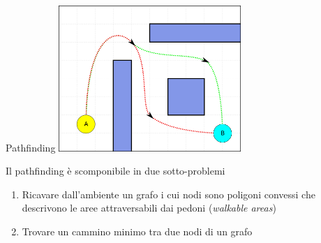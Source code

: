 \documentclass{beamer}
\begin{document}
\begin{frame}[fragile]{Pathfinding}
\hfil\hfil\includegraphics[width=6.9cm]{figures/pathfinding.png}
\begin{block}{Il pathfinding è scomponibile in due sotto-problemi}
\begin{enumerate}
    \item Ricavare dall'ambiente un grafo i cui nodi sono \textcolor{bostonuniversityred}{poligoni convessi} che descrivono le aree attraversabili dai pedoni (\emph{walkable areas})
    \item Trovare un cammino minimo tra due nodi di un grafo
\end{enumerate}{}
\end{block}{}

\end{frame}
\end{document}
